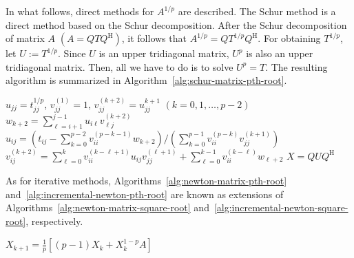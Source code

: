 {In what follows, direct methods for $A^{1/p}$ are described. The Schur method is a direct method based on the Schur decomposition. After the Schur decomposition of matrix $A$ $(A=QTQ^{\mathrm H})$, it follows that $A^{1/p}=QT^{1/p}Q^{\mathrm H}$. For obtaining $T^{1/p}$, let $U:=T^{1/p}$. Since $U$ is an upper tridiagonal matrix, $U^p$ is also an upper tridiagonal matrix. Then, all we have to do is to solve $U^p=T$. The resulting algorithm is summarized in Algorithm~\ref{alg:schur-matrix-pth-root}.}

\begin{algorithm}[H]\caption{{(Direct method) Schur method for $X=A^{1/p}$}}\label{alg:schur-matrix-pth-root}\begin{algorithmic}[1]
\State $u_{jj}=t_{jj}^{1/p}$, $v_{jj}^{(1)}=1$, $v_{jj}^{(k+2)}=u_{jj}^{k+1}$ $(k=0,1,\ldots,p-2)$
\State $w_{k+2}=\sum_{\ell=i+1}^{j-1}u_{i\ell}v_{\ell j}^{(k+2)}$
\EndFor
\State $u_{ij}=(t_{ij}-\sum_{k=0}^{p-2}v_{ii}^{(p-k-1)}w_{k+2})/(\sum_{k=0}^{p-1}v_{ii}^{(p-k)}v_{jj}^{(k+1)})$
\State $v_{ij}^{(k+2)}=\sum_{\ell=0}^k v_{ii}^{(k-\ell+1)}u_{ij}v_{jj}^{(\ell+1)}+\sum_{\ell=0}^{k-1}v_{ii}^{(k-\ell)}w_{\ell+2}$
\EndFor
\EndFor
\EndFor
\State $X=QUQ^{\mathrm H}$
\end{algorithmic}\end{algorithm}

{As for iterative methods, Algorithms~\ref{alg:newton-matrix-pth-root} and~\ref{alg:incremental-newton-pth-root} are known as extensions of Algorithms~\ref{alg:newton-matrix-square-root} and~\ref{alg:incremental-newton-square-root}, respectively.}

\begin{algorithm}[H]\caption{{(Iterative method) Newton's method for $A^{1/p}$}}\label{alg:newton-matrix-pth-root}\begin{algorithmic}[1]
\State $X_{k+1}=\frac{1}{p}[(p-1)X_k+X_k^{1-p}A]$
\EndFor
\end{algorithmic}\end{algorithm}

